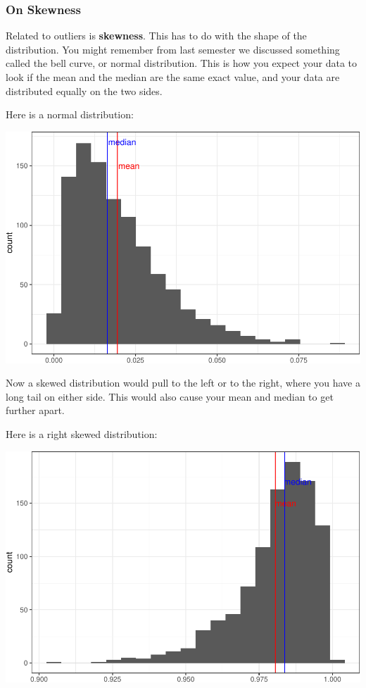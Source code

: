 \documentclass[
]{book}
\begin{document}
\hypertarget{on-skewness}{%
\subsubsection{\texorpdfstring{\textbf{On Skewness}}{On Skewness}}\label{on-skewness}}

Related to outliers is \textbf{skewness}. This has to do with the shape of the distribution. You might remember from last semester we discussed something called the bell curve, or normal distribution. This is how you expect your data to look if the mean and the median are the same exact value, and your data are distributed equally on the two sides.

Here is a normal distribution:

\includegraphics{04-descriptive-statistics_files/figure-latex/unnamed-chunk-43-1.pdf}

Now a skewed distribution would pull to the left or to the right, where you have a long tail on either side. This would also cause your mean and median to get further apart.

Here is a right skewed distribution:

\includegraphics{04-descriptive-statistics_files/figure-latex/unnamed-chunk-44-1.pdf}
\end{document}
